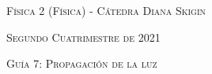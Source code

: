 \documentclass[11pt,spanish]{article}
\begin{document}
    \begin{center}
    \textsc{\large Física 2 (Física) - Cátedra Diana Skigin}
    \par\end{center}{\large \par}
    
    \begin{center}
    \textsc{\large Segundo Cuatrimestre de 2021}
    \par\end{center}{\large \par}
    
    \begin{center}
    \textsc{\large Guía 7: Propagación de la luz}
    \par\end{center}{\large \par}
\end{document}
